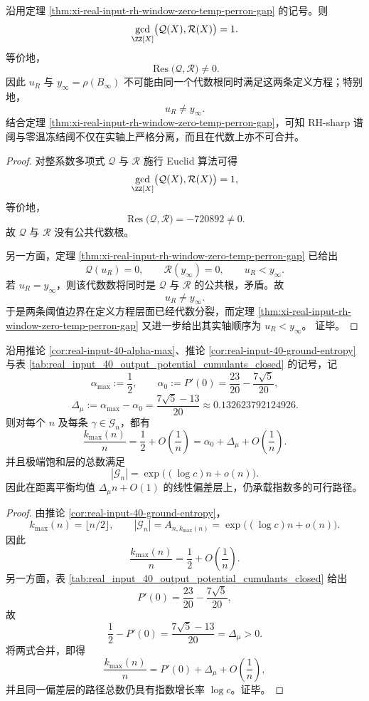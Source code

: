 \begin{theorem}\label{thm:xi-real-input-rh-threshold-zero-temp-algebraic-splitting}
沿用定理 \ref{thm:xi-real-input-rh-window-zero-temp-perron-gap} 的记号。则
\[
\gcd_{\ZZ[X]}\bigl(\mathcal Q(X),\mathcal R(X)\bigr)=1.
\]
等价地，
\[
\operatorname{Res}\bigl(\mathcal Q,\mathcal R\bigr)\neq 0.
\]
因此 \(u_R\) 与 \(y_\infty=\rho(B_\infty)\) 不可能由同一个代数根同时满足这两条定义方程；特别地，
\[
u_R\neq y_\infty.
\]
结合定理 \ref{thm:xi-real-input-rh-window-zero-temp-perron-gap}，可知 RH-sharp 谱阈与零温冻结阈不仅在实轴上严格分离，而且在代数上亦不可合并。
\end{theorem}
\begin{proof}
对整系数多项式 \(\mathcal Q\) 与 \(\mathcal R\) 施行 Euclid 算法可得
\[
\gcd_{\ZZ[X]}\bigl(\mathcal Q(X),\mathcal R(X)\bigr)=1,
\]
等价地，
\[
\operatorname{Res}\bigl(\mathcal Q,\mathcal R\bigr)=-720892\neq 0.
\]
故 \(\mathcal Q\) 与 \(\mathcal R\) 没有公共代数根。

另一方面，定理 \ref{thm:xi-real-input-rh-window-zero-temp-perron-gap} 已给出
\[
\mathcal Q(u_R)=0,
\qquad
\mathcal R(y_\infty)=0,
\qquad
u_R<y_\infty.
\]
若 \(u_R=y_\infty\)，则该代数数将同时是 \(\mathcal Q\) 与 \(\mathcal R\) 的公共根，矛盾。故
\[
u_R\neq y_\infty.
\]
于是两条阈值边界在定义方程层面已经代数分裂，而定理 \ref{thm:xi-real-input-rh-window-zero-temp-perron-gap} 又进一步给出其实轴顺序为
\(
u_R<y_\infty
\)。
证毕。
\end{proof}



\begin{theorem}[最大密度层与平衡均值之间存在显式代数间隙而仍保留正熵]\label{thm:xi-real-input-ground-layer-mean-gap-positive-entropy}
沿用推论 \ref{cor:real-input-40-alpha-max}、推论 \ref{cor:real-input-40-ground-entropy} 与表 \ref{tab:real_input_40_output_potential_cumulants_closed} 的记号，记
\[
\alpha_{\max}:=\frac12,
\qquad
\alpha_0:=P'(0)=\frac{23}{20}-\frac{7\sqrt5}{20},
\]
\[
\Delta_\mu:=\alpha_{\max}-\alpha_0
=
\frac{7\sqrt5-13}{20}
\approx 0.132623792124926.
\]
则对每个 \(n\) 及每条 \(\gamma\in\mathcal G_n\)，都有
\[
\frac{k_{\max}(n)}{n}
=
\frac12+O\!\left(\frac{1}{n}\right)
=
\alpha_0+\Delta_\mu+O\!\left(\frac{1}{n}\right).
\]
并且极端饱和层的总数满足
\[
|\mathcal G_n|
=
\exp\bigl((\log c)n+o(n)\bigr).
\]
因此在距离平衡均值 \(\Delta_\mu n+O(1)\) 的线性偏差层上，仍承载指数多的可行路径。
\end{theorem}
\begin{proof}
由推论 \ref{cor:real-input-40-ground-entropy}，
\[
k_{\max}(n)=\lfloor n/2\rfloor,
\qquad
|\mathcal G_n|=A_{n,k_{\max}(n)}
=
\exp\bigl((\log c)n+o(n)\bigr).
\]
因此
\[
\frac{k_{\max}(n)}{n}=\frac12+O\!\left(\frac{1}{n}\right).
\]
另一方面，表 \ref{tab:real_input_40_output_potential_cumulants_closed} 给出
\[
P'(0)=\frac{23}{20}-\frac{7\sqrt5}{20},
\]
故
\[
\frac12-P'(0)=\frac{7\sqrt5-13}{20}=\Delta_\mu>0.
\]
将两式合并，即得
\[
\frac{k_{\max}(n)}{n}
=
P'(0)+\Delta_\mu+O\!\left(\frac{1}{n}\right),
\]
并且同一偏差层的路径总数仍具有指数增长率 \(\log c\)。证毕。
\end{proof}


